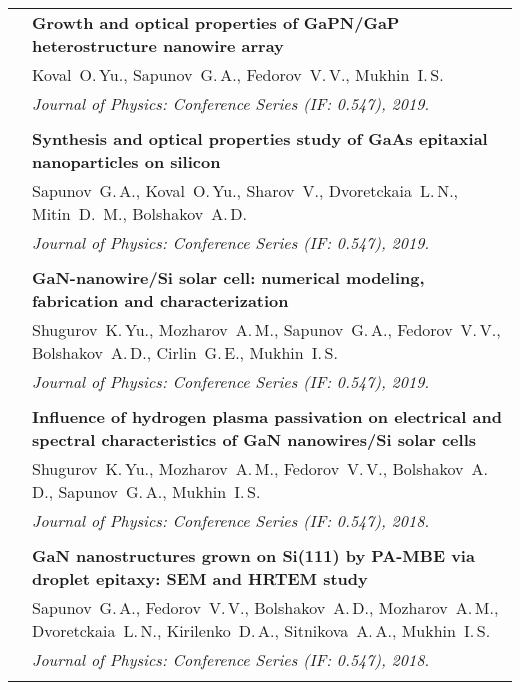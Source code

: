 \documentclass[letterpaper, 11pt]{article}
\begin{document}
\begin{longtable}{p{1.3in}p{4.8in}}
        & \textbf{Growth and optical properties of GaPN/GaP heterostructure
        nanowire array} \\
        & Koval~O.\,Yu., Sapunov~G.\,A., Fedorov~V.\,V., Mukhin~I.\,S. \\
		& \textit{Journal of Physics: Conference Series (IF: 0.547), 2019.}\\
		& \\
		
        & \textbf{Synthesis and optical properties study of GaAs epitaxial
        nanoparticles on silicon} \\
        & Sapunov~G.\,A., Koval~O.\,Yu., Sharov~V., Dvoretckaia~L.\,N.,
        Mitin~D.\, M., Bolshakov~A.\,D. \\
		& \textit{Journal of Physics: Conference Series (IF: 0.547), 2019.}\\
		& \\
		
        & \textbf{GaN-nanowire/Si solar cell: numerical modeling, fabrication
        and characterization} \\
        & Shugurov~K.\,Yu., Mozharov~A.\,M., Sapunov~G.\,A., Fedorov~V.\,V.,
        Bolshakov~A.\,D., Cirlin~G.\,E., Mukhin~I.\,S. \\
		& \textit{Journal of Physics: Conference Series (IF: 0.547), 2019.}\\
		& \\
		
        & \textbf{Influence of hydrogen plasma passivation on electrical and
        spectral characteristics of GaN nanowires/Si solar cells} \\
        & Shugurov~K.\,Yu., Mozharov~A.\,M., Fedorov~V.\,V., Bolshakov~A.\,D.,
        Sapunov~G.\,A., Mukhin~I.\,S. \\
		& \textit{Journal of Physics: Conference Series (IF: 0.547), 2018.}\\
		& \\
		
        & \textbf{GaN nanostructures grown on Si(111) by PA-MBE via droplet
        epitaxy: SEM and HRTEM study} \\
        & Sapunov~G.\,A., Fedorov~V.\,V., Bolshakov~A.\,D., Mozharov~A.\,M.,
        Dvoretckaia~L.\,N., Kirilenko~D.\,A., Sitnikova~A.\,A., Mukhin~I.\,S.
        \\
		& \textit{Journal of Physics: Conference Series (IF: 0.547), 2018.}\\
		& \\
		

\end{longtable}
\end{document}
